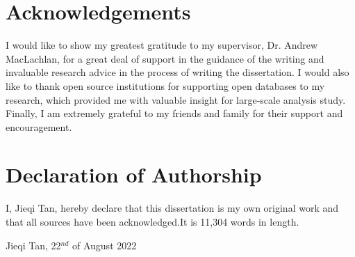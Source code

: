 \documentclass[12pt]{report}
\numberwithin{figure}{section}
\numberwithin{table}{section}
\begin{document}
\newpage
\chapter*{Acknowledgements}
I would like to show my greatest gratitude to my supervisor, Dr. Andrew MacLachlan, for a great deal of support in the guidance of the writing and invaluable research advice in the process of writing the dissertation. I would also like to thank open source institutions for supporting open databases to my research, which provided me with valuable insight for large-scale analysis study. Finally, I am extremely grateful to my friends and family for their support and encouragement.




\newpage
\chapter*{Declaration of Authorship}
I, Jieqi Tan, hereby declare that this dissertation is my own original work and that all sources have been acknowledged.It is 11,304 words in length.\\
\begin{figure}[H]

\end{figure}
Jieqi Tan, 22$^{nd}$ of August 2022



\newpage


\newpage
 

\newpage
 

\newpage


\newpage
 

\newpage
 

\newpage
\printbibliography[title = {References}]
\end{document}
